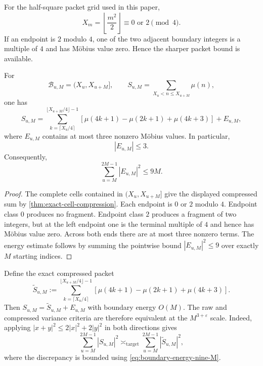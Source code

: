For the half-square packet grid used in this paper,
\[
 X_m=\left\lfloor\frac{m^2}{2}\right\rfloor
 \equiv0\text{ or }2\pmod4.
\]
If an endpoint is $2$ modulo $4$, one of the two adjacent boundary integers is
a multiple of $4$ and has M\"obius value zero.  Hence the sharper packet bound
is available.

\begin{theorem}
\label{thm:half-square-packet-compression}
For
\[
 \mathcal B_{u,M}=(X_u,X_{u+M}],
 \qquad
 S_{u,M}=\sum_{X_u<n\le X_{u+M}}\mu(n),
\]
one has
\begin{equation}
 \boxed{
 S_{u,M}
 =
 \sum_{k=\lceil X_u/4\rceil}^{\lfloor X_{u+M}/4\rfloor-1}
 \left[
  \mu(4k+1)-\mu(2k+1)+\mu(4k+3)
 \right]
 +E_{u,M},
 }
 \label{eq:half-square-compressed-packet}
\end{equation}
where $E_{u,M}$ contains at most three nonzero M\"obius values.  In particular,
\begin{equation}
 \boxed{|E_{u,M}|\le3.}
 \label{eq:half-square-boundary-three}
\end{equation}
Consequently,
\begin{equation}
 \boxed{
 \sum_{u=M}^{2M-1}|E_{u,M}|^2\le9M.
 }
 \label{eq:boundary-energy-nine-M}
\end{equation}
\end{theorem}

\begin{proof}
The complete cells contained in $(X_u,X_{u+M}]$ give the displayed compressed
sum by \cref{thm:exact-cell-compression}.  Each endpoint is $0$ or $2$ modulo
$4$.  Endpoint class $0$ produces no fragment.  Endpoint class $2$ produces a
fragment of two integers, but at the left endpoint one is the terminal
multiple of $4$ and hence has M\"obius value zero.  Across both ends there are
at most three nonzero terms.  The energy estimate follows by summing the
pointwise bound $|E_{u,M}|^2\le9$ over exactly $M$ starting indices.
\end{proof}

Define the exact compressed packet
\begin{equation}
 \widetilde S_{u,M}
 :=
 \sum_{k=\lceil X_u/4\rceil}^{\lfloor X_{u+M}/4\rfloor-1}
 \left[
  \mu(4k+1)-\mu(2k+1)+\mu(4k+3)
 \right].
 \label{eq:compressed-packet-definition}
\end{equation}
Then $S_{u,M}=\widetilde S_{u,M}+E_{u,M}$ with boundary energy $O(M)$.
The raw and compressed variance criteria are therefore equivalent at the
$M^{3+\varepsilon}$ scale.  Indeed, applying
$|x+y|^2\le2|x|^2+2|y|^2$ in both directions gives
\begin{equation}
 \sum_{u=M}^{2M-1}|S_{u,M}|^2
 \asymp_{\mathrm{target}}
 \sum_{u=M}^{2M-1}|\widetilde S_{u,M}|^2,
 \label{eq:raw-compressed-energy-equivalence}
\end{equation}
where the discrepancy is bounded using \cref{eq:boundary-energy-nine-M}.

